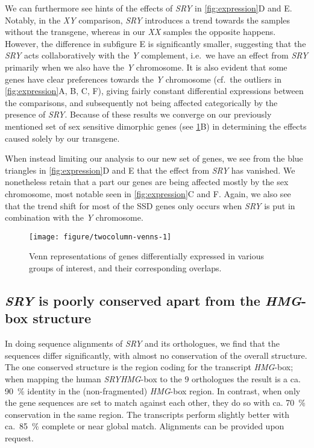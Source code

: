 \documentclass[10pt, twocolumn]{article}\usepackage[]{graphicx}\usepackage[]{color}
\makeatletter
\def\maxwidth{ %
  \ifdim\Gin@nat@width>\linewidth
    \linewidth
  \else
    \Gin@nat@width
  \fi
}
\theoremstyle{plain}
\newcommand{\SRY}{\textit{SRY}\xspace}
\newcommand{\HMG}{\textit{HMG}\xspace}
\newcommand{\XX}{\textit{XX}\xspace}
\newcommand{\Y}{\textit{Y}\xspace}
\makeatother
\begin{document}
We can furthermore see hints of the effects of \SRY in \cref{fig:expression}D and E. Notably, in the \textit{XY} comparison, \SRY introduces a trend towards the samples without the transgene, whereas in our \XX samples the opposite happens. However, the difference in subfigure E is significantly smaller, suggesting that the \SRY acts collaboratively with the \Y complement, i.e.\ we have an effect from \SRY primarily when we also have the \Y chromosome. It is also evident that some genes have clear preferences towards the \Y chromosome (cf.\ the outliers in \cref{fig:expression}A, B, C, F), giving fairly constant differential expressions between the comparisons, and subsequently not being affected categorically by the presence of \SRY. Because of these results we converge on our previously mentioned set of sex sensitive dimorphic genes (see \cref{fig:venns}B) in determining the effects caused solely by our transgene.

When instead limiting our analysis to our new set of genes, we see from the blue triangles in \cref{fig:expression}D and E that the effect from \SRY has vanished. We nonetheless retain that a part our genes are being affected mostly by the sex chromosome, most notable seen in \cref{fig:expression}C and F. Again, we also see that the trend shift for most of the SSD genes only occurs when \SRY is put in combination with the \Y chromosome.

\begin{Schunk}
\begin{figure}[H]

{\centering \texttt{[image: figure/twocolumn-venns-1]} 

}

\caption[Venn representations of genes differentially expressed in various groups of interest, and their corresponding overlaps]{Venn representations of genes differentially expressed in various groups of interest, and their corresponding overlaps.}\label{fig:venns}
\end{figure}
\end{Schunk}

\subsection*{\SRY is poorly conserved apart from the \HMG-box structure}
In doing sequence alignments of \SRY and its orthologues, we find that the sequences differ significantly, with almost no conservation of the overall structure. The one conserved structure is the region coding for the transcript \HMG-box; when mapping the human \SRY \HMG-box to the 9 orthologues the result is a ca. 90~\% identity in the (non-fragmented) \HMG-box region. In contrast, when only the gene sequences are set to match against each other, they do so with ca. 70~\% conservation in the same region. The transcripts perform slightly better with ca.\ 85~\% complete or near global match. Alignments can be provided upon request.
\end{document}
